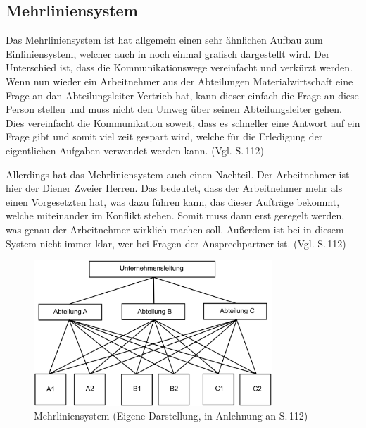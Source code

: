     \subsection{Mehrliniensystem} \label{Mehrliniensystem}
        Das Mehrliniensystem ist hat allgemein einen sehr ähnlichen Aufbau zum Einliniensystem, welcher auch in 
         noch einmal grafisch dargestellt wird. Der Unterschied ist, dass die Kommunikationswege 
        vereinfacht und verkürzt werden. Wenn nun wieder ein Arbeitnehmer aus der Abteilungen Materialwirtschaft eine 
        Frage an dan Abteilungsleiter Vertrieb hat, kann dieser einfach die Frage an diese Person stellen und muss nicht
        den Umweg über seinen Abteilungsleiter gehen. Dies vereinfacht die Kommunikation soweit, dass es schneller eine 
        Antwort auf ein Frage gibt und somit viel zeit gespart wird, welche für die Erledigung der eigentlichen Aufgaben
        verwendet werden kann. (Vgl. \cite{Woehe2020} S.\,112)

        Allerdings hat das Mehrliniensystem auch einen Nachteil. Der Arbeitnehmer ist hier der \as Diener Zweier 
        Herren\ad. Das bedeutet, dass der Arbeitnehmer mehr als einen Vorgesetzten hat, was dazu führen kann, das dieser 
        Aufträge bekommt, welche miteinander im Konflikt stehen. Somit muss dann erst geregelt werden, was genau der 
        Arbeitnehmer wirklich machen soll. Außerdem ist bei in diesem System nicht immer klar, wer bei Fragen der 
        Ansprechpartner ist. (Vgl. \cite{Woehe2020} S.\,112)

        \begin{figure}[h]
            \centering
            \includegraphics[width = 0.8\textwidth]{Eigene Darstellungen/Mehrliniensystem.PNG}
            \caption{Mehrliniensystem (Eigene Darstellung, in Anlehnung an \cite{Woehe2020} S.\,112)} \label{Mehrlinie}
        \end{figure}

